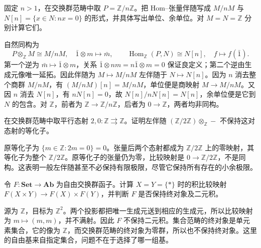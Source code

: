\begin{exercise}\label{b4:ex:03-torsion-quotient-adjunction}
	固定 \(n>1\)，在交换群范畴中取 \(P=\mathbb Z/n\mathbb Z\)。把 Hom–张量伴随写成 \(M/nM\) 与 \(N[n]=\{x\in N:nx=0\}\) 的形式，并具体写出单位、余单位。对 \(M=N=\mathbb Z\) 分别计算它们。
\end{exercise}
\begin{solution}
	自然同构为
	\[
		P\otimes_{\mathbb Z}M\cong M/nM, \quad\bar1\otimes m\longmapsto\bar m, \qquad \operatorname{Hom}_{\mathbb Z}(P,N)\cong N[n], \quad f\longmapsto f(\bar1).
	\]
	第一个逆为 \(\bar m\mapsto\bar1\otimes m\)，关系 \(\bar1\otimes nm=n\bar1\otimes m=0\) 保证良定义；第二个逆由生成元像唯一延拓。因此伴随为 \(M\mapsto M/nM\) 左伴随于 \(N\mapsto N[n]\)。因为 \(n\) 消去整个商群 \(M/nM\)，有 \((M/nM)[n]=M/nM\)，单位便是商映射 \(M\rightarrow M/nM\)。又因 \(n\) 消去 \(N[n]\)，有 \(nN[n]=0\)，故 \(N[n]/nN[n]=N[n]\)，余单位便是它到 \(N\) 的包含。对 \(\mathbb Z\)，前者为 \(\mathbb Z\rightarrow\mathbb Z/n\mathbb Z\)，后者为 \(0\rightarrow\mathbb Z\)，两者均非同构。
\end{solution}

\begin{exercise}\label{b4:ex:03-tensor-equalizer-failure}
	在交换群范畴中取平行态射 \(2,0:\mathbb Z\rightrightarrows\mathbb Z\)。证明左伴随 \((\mathbb Z/2\mathbb Z)\otimes_{\mathbb Z}-\) 不保持这对态射的等化子。
\end{exercise}
\begin{solution}
	原等化子为 \(\{m\in\mathbb Z:2m=0\}=0\)。张量后两个态射都成为 \(\mathbb Z/2\mathbb Z\) 上的零映射，其等化子为整个 \(\mathbb Z/2\mathbb Z\)。原等化子的张量仍为零，比较映射是 \(0\rightarrow\mathbb Z/2\mathbb Z\)，不是同构。这表明一般左伴随甚至不必保持有限极限，尽管它保持所有存在的小余极限。
\end{solution}

\begin{exercise}\label{b4:ex:03-free-product-comparison}
	令 \(F:\mathbf{Set}\rightarrow\mathbf{Ab}\) 为自由交换群函子。计算 \(X=Y=\{*\}\) 时的积比较映射 \(F(X\times Y)\rightarrow F(X)\times F(Y)\)，并判断 \(F\) 是否保持终对象及二元积。
\end{exercise}
\begin{solution}
	源为 \(\mathbb Z\)，目标为 \(\mathbb Z^2\)。两个投影都把唯一生成元送到相应的生成元，所以比较映射为 \(m\mapsto(m,m)\)，并不满射。因此 \(F\) 不保持二元积。集合范畴的终对象是单元素集合，它的像为 \(\mathbb Z\)，而交换群范畴的终对象为零群，所以也不保持终对象。这里的自由基来自指定集合，问题不在于选择了哪一组基。
\end{solution}

